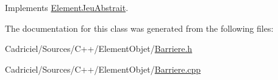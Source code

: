 Implements \hyperlink{class_element_jeu_abstrait_aa757ff192c8fb88de966112d58fdc2a9}{Element\-Jeu\-Abstrait}.



The documentation for this class was generated from the following files\-:\begin{DoxyCompactItemize}
\item 
Cadriciel/\-Sources/\-C++/\-Element\-Objet/\hyperlink{_barriere_8h}{Barriere.\-h}\item 
Cadriciel/\-Sources/\-C++/\-Element\-Objet/\hyperlink{_barriere_8cpp}{Barriere.\-cpp}\end{DoxyCompactItemize}

